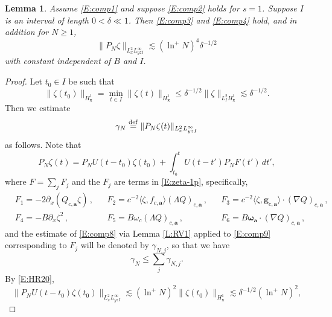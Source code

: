 \documentclass[12pt,letterpaper]{amsart}
\newcommand{\la}{\langle}
\newcommand{\ra}{\rangle}
\newcommand{\defeq}{\stackrel{\rm{def}}{=}}
\newtheorem{lemma}[theorem]{Lemma}
\theoremstyle{remark}
\numberwithin{equation}{section}
\numberwithin{theorem}{section}
\numberwithin{table}{section}
\begin{document}
\begin{lemma}
\label{L:comp3}
Assume \eqref{E:comp1} and suppose  \eqref{E:comp2} holds for $s=1$. Suppose $I$ is an interval of length $0<\delta \ll 1$.  Then \eqref{E:comp3} and \eqref{E:comp4} hold, and in addition for $N\geq 1$,
\begin{equation}
\label{E:comp5}
\|P_N \zeta \|_{L_x^2 L_{yz I}^\infty} \lesssim (\ln^+ N)^4 \delta^{-1/2}
\end{equation}
with constant independent of $B$ and $I$.
\end{lemma}
\begin{proof}
Let $t_0\in I$ be such that
\begin{equation}
\label{E:comp10}
\|\zeta(t_0)\|_{H_{\mathbf{x}}^1} = \min_{t\in I} \|\zeta(t)\|_{H_{\mathbf{x}}^1} \leq \delta^{-1/2} \| \zeta \|_{L_I^2H_{\mathbf{x}}^1} \lesssim \delta^{-1/2}.
\end{equation}
Then we estimate
\begin{equation}
\label{E:comp8}
\gamma_N \defeq \| P_N \zeta(t) \|_{L_x^2 L_{y z I}^\infty}
\end{equation}
as follows.  Note that
\begin{equation}
\label{E:comp9}
P_N \zeta(t) = P_N  U(t-t_0) \zeta(t_0) + \int_{t_0}^t U(t-t') P_N F(t') \,d t',
\end{equation}
where $F = \sum_j F_j$ and the $F_j$ are terms in \eqref{E:zeta-1p}, specifically,
\begin{equation}
\label{E:comp9b}
\begin{aligned}
& F_1 = - 2 \partial_x ( Q_{c,\mathbf{a}} \zeta) \,,
&& F_2 =  c^{-2} \la \zeta, f_{c,\mathbf{a}}\ra (\Lambda Q)_{c,\mathbf{a}} \,,
&& F_3 =  c^{-2}\la \zeta, \mathbf{g}_{c,\mathbf{a}} \ra \cdot (\nabla Q)_{c,\mathbf{a}} \,, \\
&F_4 = - B \partial_x \zeta^2 \,,
&&F_5 = B \omega_c (\Lambda Q)_{c,\mathbf{a}} \,,
&&F_6 =  B\boldsymbol{\omega}_{\mathbf{a}} \cdot (\nabla Q)_{c,\mathbf{a}} \,,
\end{aligned}
\end{equation}
and the estimate of \eqref{E:comp8} via Lemma \ref{L:RV1} applied to \eqref{E:comp9} corresponding to $F_j$ will be denoted by $\gamma_{N,j}$, so that we have 
$$\gamma_N \leq \sum_j \gamma_{N,j}.$$
By \eqref{E:HR20},
\begin{equation}
\label{E:comp11}
\|P_N U(t-t_0) \zeta (t_0) \|_{L_x^2 L_{y z I}^\infty} \lesssim (\ln^+ N)^2 \| \zeta(t_0) \|_{H_{\mathbf{x}}^1} \lesssim \delta^{-1/2} (\ln^+ N)^2,
\end{equation}

\end{proof}
\end{document}
